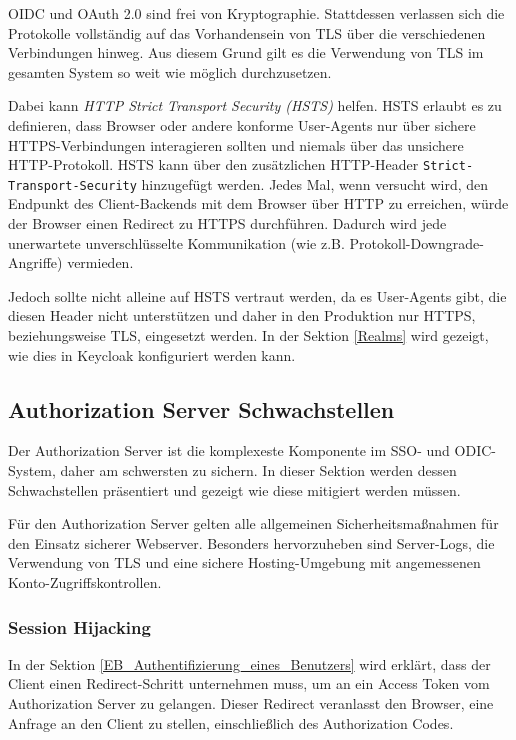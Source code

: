 OIDC und OAuth 2.0 sind frei von Kryptographie. Stattdessen verlassen sich die Protokolle vollständig auf das Vorhandensein von TLS über die verschiedenen Verbindungen hinweg. Aus diesem Grund gilt es die Verwendung von TLS im gesamten System so weit wie möglich durchzusetzen.

Dabei kann \textit{HTTP Strict Transport Security (HSTS)} helfen. HSTS erlaubt es zu definieren, dass Browser oder andere konforme User-Agents nur über sichere HTTPS-Verbindungen interagieren sollten und niemals über das unsichere HTTP-Protokoll. HSTS kann über den zusätzlichen HTTP-Header \texttt{Strict-Transport-Security} hinzugefügt werden. Jedes Mal, wenn versucht wird, den Endpunkt des Client-Backends mit dem Browser über HTTP zu erreichen, würde der Browser einen Redirect zu HTTPS durchführen. Dadurch wird jede unerwartete unverschlüsselte Kommunikation (wie z.B. Protokoll-Downgrade-Angriffe) vermieden. \cite{OAuth2inAction}

Jedoch sollte nicht alleine auf HSTS vertraut werden, da es User-Agents gibt, die diesen Header nicht unterstützen und daher in den Produktion nur HTTPS, beziehungsweise TLS, eingesetzt werden. In der Sektion \ref{Realms} wird gezeigt, wie dies in Keycloak konfiguriert werden kann.

\subsection{Authorization Server Schwachstellen}

Der Authorization Server ist die komplexeste Komponente im SSO- und ODIC-System, daher am schwersten zu sichern. In dieser Sektion werden dessen Schwachstellen präsentiert und gezeigt wie diese mitigiert werden müssen.

Für den Authorization Server gelten alle allgemeinen Sicherheitsmaßnahmen für den Einsatz sicherer Webserver. Besonders hervorzuheben sind Server-Logs, die Verwendung von TLS und eine sichere Hosting-Umgebung mit angemessenen Konto-Zugriffskontrollen.


\subsubsection{Session Hijacking}

In der Sektion \ref{EB_Authentifizierung_eines_Benutzers} wird erklärt, dass der Client einen Redirect-Schritt unternehmen muss, um an ein Access Token vom Authorization Server zu gelangen. Dieser Redirect veranlasst den Browser, eine Anfrage an den Client zu stellen, einschließlich des Authorization Codes.


